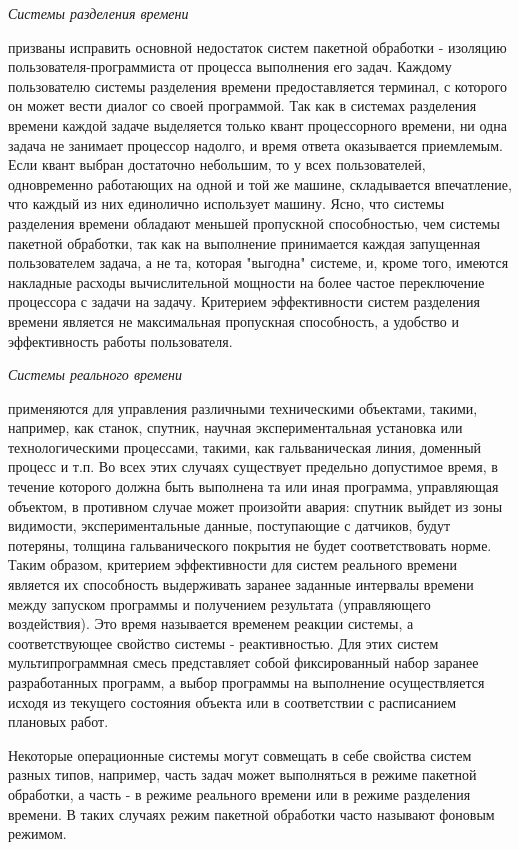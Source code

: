 \hypertarget{opr2_FEAT}{\textit{Системы разделения времени}} призваны исправить основной недостаток систем пакетной обработки - изоляцию пользователя-программиста от процесса выполнения его задач. Каждому пользователю системы разделения времени предоставляется терминал, с которого он может вести диалог со своей программой. Так как в системах разделения времени каждой задаче выделяется только квант процессорного времени, ни одна задача не занимает процессор надолго, и время ответа оказывается приемлемым. Если квант выбран достаточно небольшим, то у всех пользователей, одновременно работающих на одной и той же машине, складывается впечатление, что каждый из них единолично использует машину. Ясно, что системы разделения времени обладают меньшей пропускной способностью, чем системы пакетной обработки, так как на выполнение принимается каждая запущенная пользователем задача, а не та, которая "выгодна" системе, и, кроме того, имеются накладные расходы вычислительной мощности на более частое переключение процессора с задачи на задачу. Критерием эффективности систем разделения времени является не максимальная пропускная способность, а удобство и эффективность работы пользователя.


\hypertarget{opr3_FEAT}{\textit{Системы реального времени}} применяются для управления различными техническими объектами, такими, например, как станок, спутник, научная экспериментальная установка или технологическими процессами, такими, как гальваническая линия, доменный процесс и т.п. Во всех этих случаях существует предельно допустимое время, в течение которого должна быть выполнена та или иная программа, управляющая объектом, в противном случае может произойти авария: спутник выйдет из зоны видимости, экспериментальные данные, поступающие с датчиков, будут потеряны, толщина гальванического покрытия не будет соответствовать норме. Таким образом, критерием эффективности для систем реального времени является их способность выдерживать заранее заданные интервалы времени между запуском программы и получением результата (управляющего воздействия). Это время называется временем реакции системы, а соответствующее свойство системы - реактивностью. Для этих систем мультипрограммная смесь представляет собой фиксированный набор заранее разработанных программ, а выбор программы на выполнение осуществляется исходя из текущего состояния объекта или в соответствии с расписанием плановых работ.

Некоторые операционные системы могут совмещать в себе свойства систем разных типов, например, часть задач может выполняться в режиме пакетной обработки, а часть - в режиме реального времени или в режиме разделения времени. В таких случаях режим пакетной обработки часто называют фоновым режимом.
